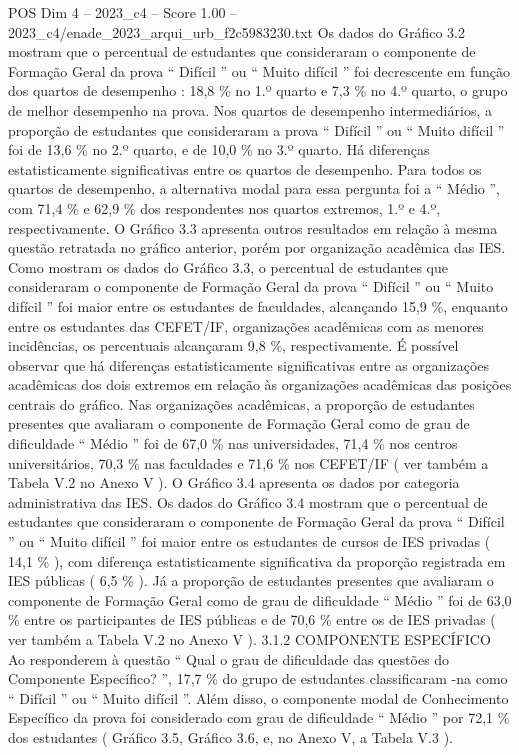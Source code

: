 \begin{textsample}{POS Dim 4 – 2023\_c4 – Score 1.00 – 2023\_c4/enade\_2023\_arqui\_urb\_f2c5983230.txt}
Os dados do Gráfico 3.2 mostram que o percentual de estudantes que consideraram o componente de Formação Geral da prova “ Difícil ” ou “ Muito difícil ” foi decrescente em função dos quartos de desempenho : 18,8 \% no 1.º quarto e 7,3 \% no 4.º quarto, o grupo de melhor desempenho na prova.
Nos quartos de desempenho intermediários, a proporção de estudantes que consideraram a prova “ Difícil ” ou “ Muito difícil ” foi de 13,6 \% no 2.º quarto, e de 10,0 \% no 3.º quarto.
Há diferenças estatisticamente significativas entre os quartos de desempenho.
Para todos os quartos de desempenho, a alternativa modal para essa pergunta foi a “ Médio ”, com 71,4 \% e 62,9 \% dos respondentes nos quartos extremos, 1.º e 4.º, respectivamente.
O Gráfico 3.3 apresenta outros resultados em relação à mesma questão retratada no gráfico anterior, porém por organização acadêmica das IES.
Como mostram os dados do Gráfico 3.3, o percentual de estudantes que consideraram o componente de Formação Geral da prova “ Difícil ” ou “ Muito difícil ” foi maior entre os estudantes de faculdades, alcançando 15,9 \%, enquanto entre os estudantes das CEFET/IF, organizações acadêmicas com as menores incidências, os percentuais alcançaram 9,8 \%, respectivamente.
É possível observar que há diferenças estatisticamente significativas entre as organizações acadêmicas dos dois extremos em relação às organizações acadêmicas das posições centrais do gráfico.
Nas organizações acadêmicas, a proporção de estudantes presentes que avaliaram o componente de Formação Geral como de grau de dificuldade “ Médio ” foi de 67,0 \% nas universidades, 71,4 \% nos centros universitários, 70,3 \% nas faculdades e 71,6 \% nos CEFET/IF ( ver também a Tabela V.2 no Anexo V ).
O Gráfico 3.4 apresenta os dados por categoria administrativa das IES.
Os dados do Gráfico 3.4 mostram que o percentual de estudantes que consideraram o componente de Formação Geral da prova “ Difícil ” ou “ Muito difícil ” foi maior entre os estudantes de cursos de IES privadas ( 14,1 \% ), com diferença estatisticamente significativa da proporção registrada em IES públicas ( 6,5 \% ).
Já a proporção de estudantes presentes que avaliaram o componente de Formação Geral como de grau de dificuldade “ Médio ” foi de 63,0 \% entre os participantes de IES públicas e de 70,6 \% entre os de IES privadas ( ver também a Tabela V.2 no Anexo V ). 3.1.2 COMPONENTE ESPECÍFICO Ao responderem à questão “ Qual o grau de dificuldade das questões do Componente Específico? ”, 17,7 \% do grupo de estudantes classificaram -na como “ Difícil ” ou “ Muito difícil ”.
Além disso, o componente modal de Conhecimento Específico da prova foi considerado com grau de dificuldade “ Médio ” por 72,1 \% dos estudantes ( Gráfico 3.5, Gráfico 3.6, e, no Anexo V, a Tabela V.3 ).

\end{textsample}
